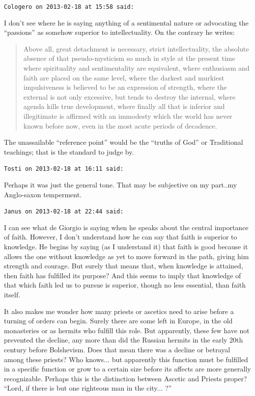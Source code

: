 \begin{footnotesize}
\begin{sffamily}
\hfill

\texttt{Cologero on 2013-02-18 at 15:58 said:}

I don't see where he is saying anything of a sentimental nature or advocating the ``passions'' as somehow superior to intellectuality. On the contrary he writes:

\begin{quote}

Above all, great detachment is necessary, strict intellectuality, the absolute absence of that pseudo-mysticism so much in style at the present time where spirituality and sentimentality are equivalent, where enthusiasm and faith are placed on the same level, where the darkest and murkiest impulsiveness is believed to be an expression of strength, where the external is not only excessive, but tends to destroy the internal, where agenda kills true development, where finally all that is inferior and illegitimate is affirmed with an immodesty which the world has never known before now, even in the most acute periods of decadence.
\end{quote}


The unassailable ``reference point'' would be the ``truths of God'' or Traditional teachings; that is the standard to judge by.

\hfill

\texttt{Tosti on 2013-02-18 at 16:11 said:}

Perhaps it was just the general tone. That may be subjective on my part..my Anglo-saxon temperment.

\hfill

\texttt{Janus on 2013-02-18 at 22:44 said:}

I can see what de Giorgio is saying when he speaks about the central importance of faith. However, I don't understand how he can say that faith is superior to knowledge. He begins by saying (as I understand it) that faith is good because it allows the one without knowledge as yet to move forward in the path, giving him strength and courage. But surely that means that, when knowledge is attained, then faith has fulfilled its purpose? And this seems to imply that knowledge of that which faith led us to pursue is superior, though no less essential, than faith itself.

It also makes me wonder how many priests or ascetics need to arise before a turning of orders can begin. Surely there are some left in Europe, in the old monasteries or as hermits who fulfill this role. But apparently, these few have not prevented the decline, any more than did the Russian hermits in the early 20th century before Bolshevism. Does that mean there was a decline or betrayal among these priests? Who knows... but apparently this function must be fulfilled in a specific function or grow to a certain size before its affects are more generally recognizable. Perhaps this is the distinction between Ascetic and Priests proper? ``Lord, if there is but one righteous man in the city... ?''


\end{sffamily}
\end{footnotesize}
